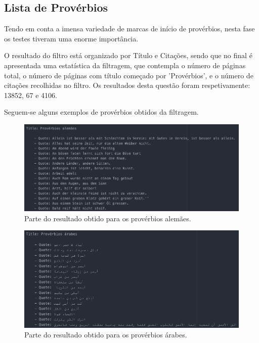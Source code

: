 \documentclass[11pt,a4paper]{report}
\begin{document}
\subsection{Lista de Provérbios}

Tendo em conta a imensa variedade de marcas de início de provérbios, nesta fase os testes tiveram uma enorme importância.

O resultado do filtro está organizado por Título e Citações, sendo que no final é apresentada uma estatística da filtragem, que contempla o número de páginas total, o número de páginas com título começado por 'Provérbios', e o número de citações recolhidas no filtro. Os resultados desta questão foram respetivamente: 13852, 67 e 4106.

Seguem-se alguns exemplos de provérbios obtidos da filtragem.

\begin{figure}[H]
\centering
\includegraphics[scale=0.5]{proverbios_alemaes2.png}
\caption{Parte do resultado obtido para os provérbios alemães.}
\label{img:autor}
\end{figure}

\begin{figure}[H]
\centering
\includegraphics[scale=0.53]{proverbios_arabes2.png}
\caption{Parte do resultado obtido para os provérbios árabes.}
\label{img:autor}
\end{figure}
\end{document}
